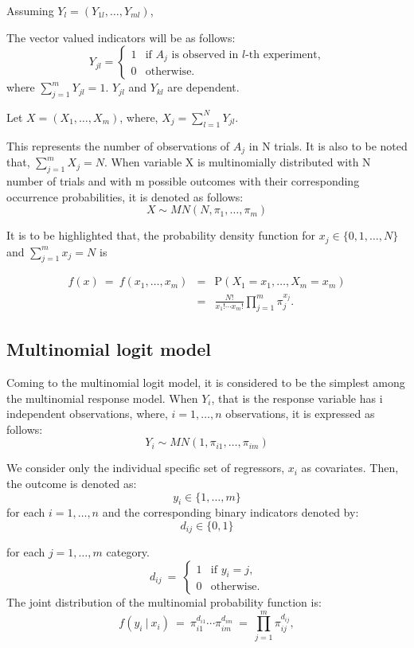 \documentclass[12pt]{article}
\begin{document}
Assuming $Y_l = (Y_{1l}, \dots, Y_{ml})$,

The vector valued indicators will be as follows:
\begin{equation*}
Y_{jl} =
    \begin{cases}
  1 & \text{if $A_j$ is observed in $l$-th experiment,} \\
  0 & \text{otherwise.}
    \end{cases}
\end{equation*}
where $\sum_{j = 1}^m Y_{jl} = 1$.  $Y_{jl}$ and  $Y_{kl}$ are dependent.

Let $X = (X_1, \dots, X_m)$, where, $X_j = \sum_{l = 1}^N Y_{jl}$.

This represents the number of observations of $A_j$ in N trials. It is also to be noted that, $\sum_{j = 1}^m X_j = N$. When variable X is multinomially distributed with N number of trials and with m possible outcomes with their corresponding occurrence probabilities, it is denoted as follows:
$$ X \sim \mathit{MN}(N, \pi_1, \dots, \pi_m) $$

It is to be highlighted that, the probability density function for $x_j \in \{0, 1, \dots, N\}$ and $\sum_{j = 1}^m x_j = N$ is

\begin{eqnarray*}
  f(x) ~=~ f(x_1, \dots, x_m)
       & = & \text{P}(X_1 = x_1, \dots, X_m = x_m) \\
       & = & \frac{N!}{x_1! \cdots x_m!} \prod_{j = 1}^m \pi_j^{x_j}.
\end{eqnarray*}

\subsection{Multinomial logit model}
Coming to the multinomial logit model, it is considered to be the simplest among the multinomial response model. When $Y_i$, that is the response variable has i independent observations, where, $i = 1, \dots, n$ observations, it is expressed as follows:
$$Y_i \sim \mathit{MN}(1, \pi_{i1}, \dots, \pi_{im})$$

We consider only the individual specific set of regressors, $x_i$ as covariates.
Then, the outcome is denoted as: $$y_i \in \{1, \dots, m\}$$ for each $i = 1, \dots, n$ and the corresponding binary indicators denoted by: 
$$d_{ij} \in \{0, 1\}$$

for each $j = 1, \dots, m$ category.
\begin{equation*}
  d_{ij} ~=~  \begin{cases}
             1 & \text{if $y_i = j$,}\\
         0 & \text{otherwise.}
             \end{cases}
\end{equation*}
The joint distribution of the multinomial probability function is:
\begin{equation*}
  f(y_i ~|~ x_i) ~=~ \pi_{i1}^{d_{i1}} \cdots \pi_{im}^{d_{im}} ~=~ \prod_{j = 1}^m \pi_{ij}^{d_{ij}},
\end{equation*}
\end{document}
